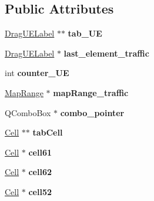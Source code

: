 \subsection*{Public Attributes}
\begin{DoxyCompactItemize}
\item 
\hyperlink{class_drag_u_e_label}{Drag\+U\+E\+Label} $\ast$$\ast$ {\bfseries tab\+\_\+\+UE}\hypertarget{class_map__traffic_a35eccdeadfe0a196a1ae4e102989dea8}{}\label{class_map__traffic_a35eccdeadfe0a196a1ae4e102989dea8}

\item 
\hyperlink{class_drag_u_e_label}{Drag\+U\+E\+Label} $\ast$ {\bfseries last\+\_\+element\+\_\+traffic}\hypertarget{class_map__traffic_ad427afddce3edd258ed59103757107e4}{}\label{class_map__traffic_ad427afddce3edd258ed59103757107e4}

\item 
int {\bfseries counter\+\_\+\+UE}\hypertarget{class_map__traffic_a0bbc92929bcdbfc316fca6389d0a373b}{}\label{class_map__traffic_a0bbc92929bcdbfc316fca6389d0a373b}

\item 
\hyperlink{class_map_range}{Map\+Range} $\ast$ {\bfseries map\+Range\+\_\+traffic}\hypertarget{class_map__traffic_a33e78b4cc9d2475aedfafd48f05246bd}{}\label{class_map__traffic_a33e78b4cc9d2475aedfafd48f05246bd}

\item 
Q\+Combo\+Box $\ast$ {\bfseries combo\+\_\+pointer}\hypertarget{class_map__traffic_af627fe60d4a410e5c3df7728aa70a5e7}{}\label{class_map__traffic_af627fe60d4a410e5c3df7728aa70a5e7}

\item 
\hyperlink{class_cell}{Cell} $\ast$$\ast$ {\bfseries tab\+Cell}\hypertarget{class_map__traffic_a79099b365dcddfa39fc5718e2daa1252}{}\label{class_map__traffic_a79099b365dcddfa39fc5718e2daa1252}

\item 
\hyperlink{class_cell}{Cell} $\ast$ {\bfseries cell61}\hypertarget{class_map__traffic_a11f6605d313e81c7ed074e5eabce5811}{}\label{class_map__traffic_a11f6605d313e81c7ed074e5eabce5811}

\item 
\hyperlink{class_cell}{Cell} $\ast$ {\bfseries cell62}\hypertarget{class_map__traffic_ac861bcc48f4a6fa476a1289ac1dc05eb}{}\label{class_map__traffic_ac861bcc48f4a6fa476a1289ac1dc05eb}

\item 
\hyperlink{class_cell}{Cell} $\ast$ {\bfseries cell52}\hypertarget{class_map__traffic_a3d3ad8ed92656c148405ce74514aa19d}{}\label{class_map__traffic_a3d3ad8ed92656c148405ce74514aa19d}


\end{DoxyCompactItemize}
